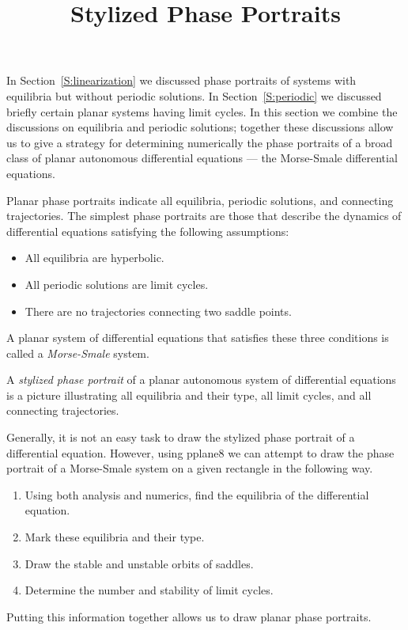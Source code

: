 \documentclass{ximera}
\title{Stylized Phase Portraits}
\begin{document}
\begin{abstract}
\end{abstract}
\maketitle

  \label{S:SPP}


In Section~\ref{S:linearization} we discussed phase portraits of systems with 
equilibria but without periodic solutions.  In Section~\ref{S:periodic} we 
discussed briefly certain planar systems having limit cycles.  In this 
section we combine the discussions on equilibria and periodic solutions; 
together these discussions allow us to give a strategy for determining 
numerically the phase portraits of a broad class of planar autonomous 
differential equations --- the Morse-Smale differential equations.
 
Planar phase portraits indicate all equilibria, periodic
solutions, and connecting trajectories.  The simplest phase
portraits are those that describe the dynamics of differential
equations satisfying the following assumptions: 
\begin{itemize}
\item	All equilibria are hyperbolic.
\item	All periodic solutions are limit cycles.
\item	There are no trajectories connecting two saddle points.
\end{itemize}
A planar system of differential equations that satisfies these
three conditions is called a {\em Morse-Smale\/} system.  

\begin{definition} \label{D:stylized}
A {\em stylized phase portrait\/} of a planar autonomous system
of differential equations is a picture illustrating all
equilibria and their type, all limit cycles, and all connecting
trajectories.
\end{definition}

Generally, it is not an easy task to draw the stylized phase
portrait of a differential equation.  However, using {\sf pplane8\/} 
we can attempt to draw the phase portrait of a
Morse-Smale system on a given rectangle in the following way.
\begin{enumerate}
\item Using both analysis and numerics, find the equilibria of
the differential equation.
\item Mark these equilibria and their type.  
\item Draw the stable and unstable orbits of saddles.  
\item Determine the number and stability of limit cycles.  
\end{enumerate}
Putting this information together allows us to draw planar phase
portraits.
\end{document}
